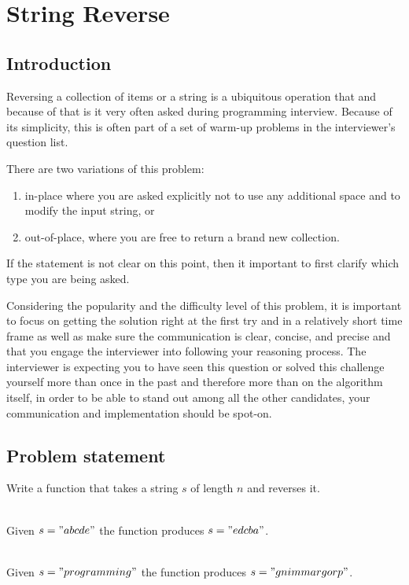 %

\chapter{String Reverse}
\label{ch:string_reverse}
\section*{Introduction}
Reversing a collection of items or a string is a ubiquitous operation that and because of that is it very often asked during programming interview. Because of its simplicity, this is often part of a set of warm-up problems in the interviewer's question list. 


There are two variations of this problem:
\begin{enumerate}
  \item in-place where you are asked explicitly not to use any additional space and to modify the input string, or
  \item out-of-place, where you are free to return a brand new collection.
\end{enumerate}

If the statement is not clear on this point, then it important to first clarify which type you are being asked. 

Considering the popularity and the difficulty level of this problem, it is important to focus on getting the solution right at the first try and in a relatively short time frame as well as make sure the communication is clear, concise, and precise and that you engage the interviewer into following your reasoning process.
The interviewer is expecting you to have seen this question or solved this challenge yourself more than once in the past and therefore more than on the algorithm itself, in order to be able to stand out among all the other candidates, your communication and implementation should be spot-on.

\section{Problem statement}
\begin{exercise}
	Write a function that takes a string $s$ of length $n$ and reverses it.
	
	\begin{example}
		\hfill \\
		Given $s="abcde"$ the function produces $s="edcba"$.
	\end{example}
	
	\begin{example}
		\hfill \\
		Given $s="programming"$ the function produces $s="gnimmargorp"$.
	\end{example}
\end{exercise}

